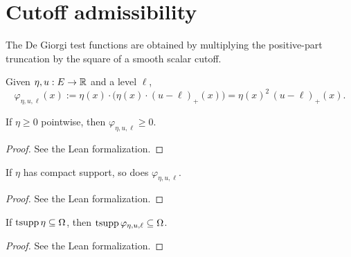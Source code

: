 \section{Cutoff admissibility}

The De Giorgi test functions are obtained by multiplying the
positive-part truncation by the square of a smooth scalar cutoff.

\begin{definition}
\label{def:deGiorgiCutoffTestGeneral}
\leanok
{}
Given $\eta, u : E \to \mathbb{R}$ and a level $\ell$,
\begin{equation*}
  \varphi_{\eta, u, \ell}(x) := \eta(x) \cdot \bigl( \eta(x) \cdot
  (u-\ell)_+(x) \bigr) = \eta(x)^2 \, (u-\ell)_+(x).
\end{equation*}
\end{definition}

\begin{lemma}
\label{lem:deGiorgiCutoffTestGeneral_nonneg}
\leanok
{}
If $\eta \ge 0$ pointwise, then $\varphi_{\eta, u, \ell} \ge 0$.
\end{lemma}

\begin{proof}
\leanok
{}
See the Lean formalization.
\end{proof}

\begin{lemma}
\label{lem:deGiorgiCutoffTestGeneral_hasCompactSupport}
\leanok
{}
If $\eta$ has compact support, so does $\varphi_{\eta,u,\ell}$.
\end{lemma}

\begin{proof}
\leanok
{}
See the Lean formalization.
\end{proof}

\begin{lemma}
\label{lem:deGiorgiCutoffTestGeneral_tsupport_subset}
\leanok
{}
If $\mathrm{tsupp}\,\eta \subseteq \Omega$, then $\mathrm{tsupp}\,\varphi_{\eta,u,\ell}
\subseteq \Omega$.
\end{lemma}

\begin{proof}
\leanok
{}
See the Lean formalization.
\end{proof}

